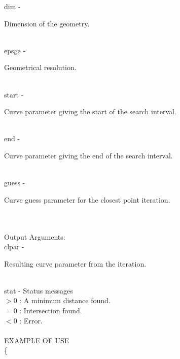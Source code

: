         \>\>    {\fov dim}\> - \>  \begin{minipg2}
                     Dimension of the geometry.
                               \end{minipg2}\\
        \>\>    {\fov epsge}\> - \>  \begin{minipg2}
                     Geometrical resolution.
                               \end{minipg2}\\
        \>\>    {\fov start}\> - \>  \begin{minipg2}
                     Curve parameter giving the start of the search
                        interval.
                               \end{minipg2}\\
        \>\>    {\fov end}\> - \>  \begin{minipg2}
                     Curve parameter giving the end of the search
                        interval.
                               \end{minipg2}\\
        \>\>    {\fov guess}\> - \>  \begin{minipg2}
                     Curve guess parameter for the closest point
                        iteration.
                               \end{minipg2}\\
\\
	\>Output Arguments:\\
        \>\>    {\fov clpar}\> - \>  \begin{minipg2}
                     Resulting curve parameter from the iteration.
                               \end{minipg2}\\
        \>\>    {\fov stat}     \> - \> Status messages\\
                \>\>\>\>\>              $> 0$   : A minimum distance found.\\
                \>\>\>\>\>              $= 0$   : Intersection found.\\
                \>\>\>\>\>              $< 0$   : Error.\\
\\
EXAMPLE OF USE\\
		\>      \{ \\

